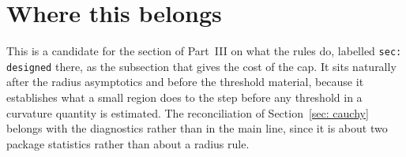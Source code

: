 \documentclass[11pt,a4paper]{article}
\begin{document}
\section{Where this belongs}\label{sec: home}

This is a candidate for the section of Part~III on what the rules do, labelled
\texttt{sec: designed} there, as the subsection that gives the cost of the cap. It sits
naturally after the radius asymptotics and before the threshold material,
because it establishes what a small region does to the step before any threshold
in a curvature quantity is estimated. The reconciliation of
Section~\ref{sec: cauchy} belongs with the diagnostics rather than in the main
line, since it is about two package statistics rather than about a radius rule.
\end{document}
